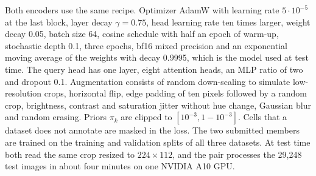 \documentclass[10pt,twocolumn,letterpaper]{article}
\begin{document}
Both encoders use the same recipe. Optimizer AdamW with learning rate $5\cdot10^{-5}$ at the last block, layer decay $\gamma=0.75$, head learning rate ten times larger, weight decay 0.05, batch size 64, cosine schedule with half an epoch of warm-up, stochastic depth 0.1, three epochs, bf16 mixed precision and an exponential moving average of the weights with decay 0.9995, which is the model used at test time. The query head has one layer, eight attention heads, an MLP ratio of two and dropout 0.1. Augmentation consists of random down-scaling to simulate low-resolution crops, horizontal flip, edge padding of ten pixels followed by a random crop, brightness, contrast and saturation jitter without hue change, Gaussian blur and random erasing. Priors $\pi_k$ are clipped to $[10^{-3},1-10^{-3}]$. Cells that a dataset does not annotate are masked in the loss. The two submitted members are trained on the training and validation splits of all three datasets. At test time both read the same crop resized to $224\times112$, and the pair processes the 29{,}248 test images in about four minutes on one NVIDIA A10 GPU.
\end{document}

